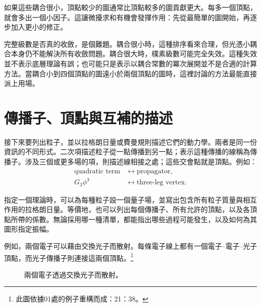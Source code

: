 如果這些耦合很小，頂點較少的圖通常比頂點較多的圖貢獻更大。每多一個頂點，就會多出一個小因子。這讓微擾求和有機會發揮作用：先從最簡單的圖開始，再逐步加入更小的修正。

完整級數是否真的收斂，是個難題。耦合很小時，這種排序看來合理，但光憑小耦合本身仍不能解決所有收斂問題。耦合很大時，樸素級數可能完全失效。這種失效並不表示底層理論有誤；也可能只是表示以耦合常數的冪次展開並不是合適的計算方法。當耦合小到四個頂點的圖遠小於兩個頂點的圖時，這裡討論的方法最能直接派上用場。

\begin{classroomqa}
\end{classroomqa}

\section{傳播子、頂點與互補的描述}

接下來要列出粒子，並以拉格朗日量或費曼規則描述它們的動力學。兩者是同一份資訊的不同形式。二次項描述粒子從一點傳播到另一點；表示這種傳播的線稱為傳播子。涉及三個或更多場的項，則描述線相接之處；這些交會點就是頂點。例如：
\begin{equation}
\begin{aligned}
\text{quadratic term}
&\longleftrightarrow \text{propagator},\\
G_3\phi^3
&\longleftrightarrow \text{three-leg vertex}.
\end{aligned}
\end{equation}

指定一個理論時，可以為每種粒子設一個量子場，並寫出包含所有粒子質量與相互作用的拉格朗日量。等價地，也可以列出每個傳播子、所有允許的頂點，以及各頂點所帶的係數。無論採用哪一種清單，都能指出哪些過程可能發生，以及如何為其圖形指定振幅。

例如，兩個電子可以藉由交換光子而散射。每條電子線上都有一個電子--電子--光子頂點，而光子傳播子則連接這兩個頂點。\footnote{此圖依據01處的例子重構而成：21：38。}

\begin{figure}[htbp]
\centering
{}
\caption{兩個電子透過交換光子而散射。}
\end{figure}

